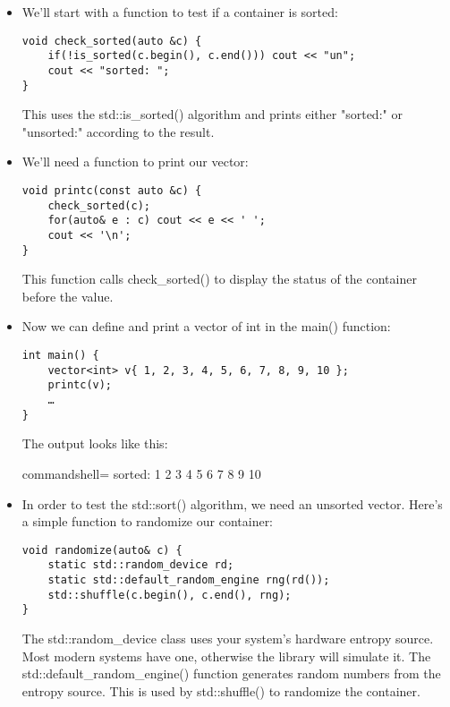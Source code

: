 \begin{itemize}
\item 
We'll start with a function to test if a container is sorted:

\begin{lstlisting}[style=styleCXX]
void check_sorted(auto &c) {
	if(!is_sorted(c.begin(), c.end())) cout << "un";
	cout << "sorted: ";
}
\end{lstlisting}

This uses the std::is\_sorted() algorithm and prints either "sorted:" or "unsorted:" according to the result.

\item 
We'll need a function to print our vector:

\begin{lstlisting}[style=styleCXX]
void printc(const auto &c) {
	check_sorted(c);
	for(auto& e : c) cout << e << ' ';
	cout << '\n';
}
\end{lstlisting}

This function calls check\_sorted() to display the status of the container before the value.

\item 
Now we can define and print a vector of int in the main() function:

\begin{lstlisting}[style=styleCXX]
int main() {
	vector<int> v{ 1, 2, 3, 4, 5, 6, 7, 8, 9, 10 };
	printc(v);
	…
}
\end{lstlisting}

The output looks like this:

\begin{tcblisting}{commandshell={}}
sorted: 1 2 3 4 5 6 7 8 9 10
\end{tcblisting}

\item 
In order to test the std::sort() algorithm, we need an unsorted vector. Here's a simple function to randomize our container:

\begin{lstlisting}[style=styleCXX]
void randomize(auto& c) {
	static std::random_device rd;
	static std::default_random_engine rng(rd());
	std::shuffle(c.begin(), c.end(), rng);
}
\end{lstlisting}

The std::random\_device class uses your system's hardware entropy source. Most modern systems have one, otherwise the library will simulate it. The std::default\_random\_engine() function generates random numbers from the entropy source. This is used by std::shuffle() to randomize the container.


\end{itemize}
